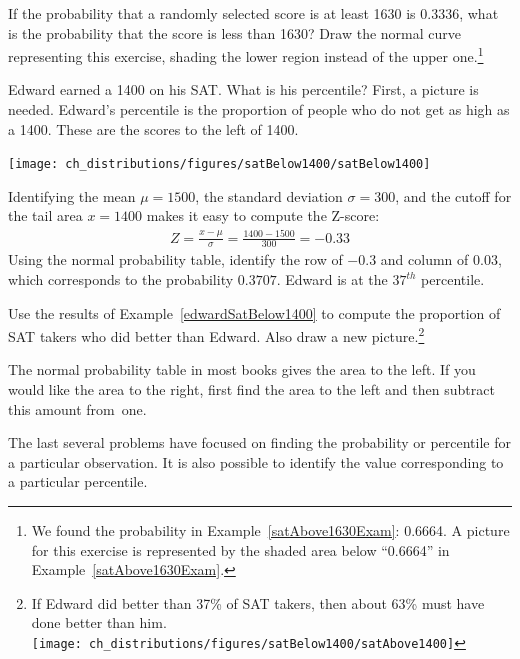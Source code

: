 \begin{exercise}
If the probability that a randomly selected score is at least 1630 is 0.3336, what is the probability that the score is less than 1630? Draw the normal curve representing this exercise, shading the lower region instead of the upper one.\footnote{We found the probability in Example~\ref{satAbove1630Exam}: 0.6664. A picture for this exercise is represented by the shaded area below ``0.6664'' in Example~\ref{satAbove1630Exam}.}
\end{exercise}

\begin{example}{Edward earned a 1400 on his SAT. What is his percentile?} \label{edwardSatBelow1400}
First, a picture is needed. Edward's percentile is the proportion of people who do not get as high as a 1400. These are the scores to the left of 1400.
\begin{center}
\texttt{[image: ch\_distributions/figures/satBelow1400/satBelow1400]}
\end{center}
Identifying the mean $\mu=1500$, the standard deviation $\sigma=300$, and the cutoff for the tail area $x=1400$ makes it easy to compute the Z-score:
\begin{eqnarray*}
Z = \frac{x - \mu}{\sigma} = \frac{1400 - 1500}{300} = -0.33
\end{eqnarray*}
Using the normal probability table, identify the row of $-0.3$ and column of $0.03$, which corresponds to the probability $0.3707$. Edward is at the $37^{th}$ percentile.
\end{example}

\begin{exercise}
Use the results of Example~\ref{edwardSatBelow1400} to compute the proportion of SAT takers who did better than Edward. Also draw a new picture.\footnote{If Edward did better than 37\% of SAT takers, then about 63\% must have done better than him. \\
\texttt{[image: ch\_distributions/figures/satBelow1400/satAbove1400]}}
\end{exercise}

\begin{tipBox}{
The normal probability table in most books gives the area to the left. If you would like the area to the right, first find the area to the left and then subtract this amount from~one.}
\end{tipBox}

The last several problems have focused on finding the probability or percentile for a particular observation. It is also possible to identify the value corresponding to a particular percentile.


